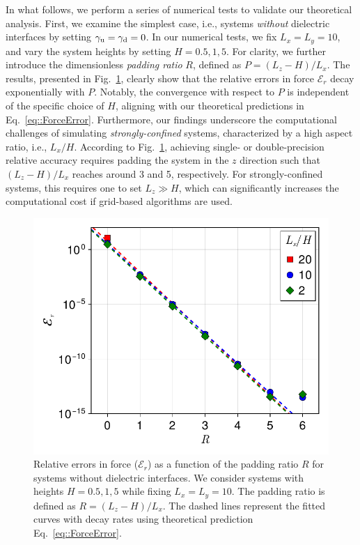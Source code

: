 In what follows, we perform a series of numerical tests to validate our theoretical analysis. 
First, we examine the simplest case, i.e., systems \emph{without} dielectric interfaces by setting $\gamma_{\text{u}} = \gamma_{\text{d}} = 0$. 
In our numerical tests, we fix $L_x = L_y = 10$, and vary the system heights by setting $H = 0.5, 1, 5$. 
For clarity, we further introduce the dimensionless \emph{padding ratio} $R$, defined as $P = (L_z - H) / L_x$. 
The results, presented in Fig.~\ref{fig:elc_error_force}, clearly show that the relative errors in force $\mathcal{E}_r$ decay exponentially with $P$. 
Notably, the convergence with respect to $P$ is independent of the specific choice of $H$, aligning with our theoretical predictions in Eq.~\eqref{eq::ForceError}. 
Furthermore, our findings underscore the computational challenges of simulating \emph{strongly-confined} systems, characterized by a high aspect ratio, i.e., $L_x / H$. 
According to Fig.~\ref{fig:elc_error_force}, achieving single- or double-precision relative accuracy requires padding the system in the $z$ direction such that $(L_z - H)/L_x$ reaches around 3 and 5, respectively. For strongly-confined systems, this requires one to set $L_z\gg H$, which can significantly increases the computational cost if grid-based algorithms are used.

\begin{figure}[htbp]
    \centering
    \includegraphics[width=0.55\linewidth]{figs/elc_error_force.pdf}
    \caption{Relative errors in force ($\mathcal{E}_r$) as a function of the padding ratio $R$ for systems without dielectric interfaces. 
    We consider systems with heights $H = 0.5, 1, 5$ while fixing $L_x=L_y=10$. The padding ratio is defined as $R = (L_z - H) / L_x$. The dashed lines represent the fitted curves with decay rates using theoretical prediction Eq.~\eqref{eq::ForceError}. }
    \label{fig:elc_error_force}
\end{figure}

